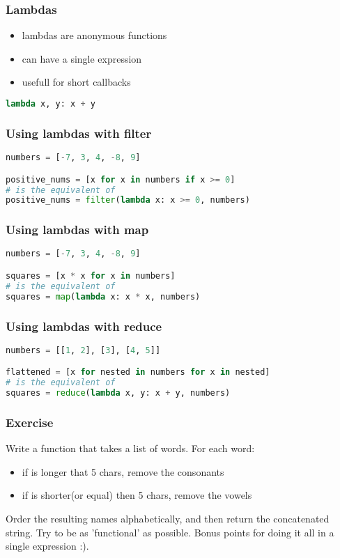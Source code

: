 \documentclass{beamer}
\begin{document}
\begin{frame}[fragile]
\frametitle{Lambdas}
\begin{itemize}
  \item lambdas are anonymous functions
  \item can have a single expression
  \item usefull for short callbacks
\end{itemize}
\begin{lstlisting}[language=python]
lambda x, y: x + y
\end{lstlisting}
\end{frame}


\begin{frame}[fragile]
\frametitle{Using lambdas with filter}
\begin{lstlisting}[language=python]
numbers = [-7, 3, 4, -8, 9]

positive_nums = [x for x in numbers if x >= 0]
# is the equivalent of
positive_nums = filter(lambda x: x >= 0, numbers)
\end{lstlisting}
\end{frame}

\begin{frame}[fragile]
\frametitle{Using lambdas with map}
\begin{lstlisting}[language=python]
numbers = [-7, 3, 4, -8, 9]

squares = [x * x for x in numbers]
# is the equivalent of
squares = map(lambda x: x * x, numbers)

\end{lstlisting}
\end{frame}

\begin{frame}[fragile]
\frametitle{Using lambdas with reduce}
\begin{lstlisting}[language=python]
numbers = [[1, 2], [3], [4, 5]]

flattened = [x for nested in numbers for x in nested]
# is the equivalent of
squares = reduce(lambda x, y: x + y, numbers)

\end{lstlisting}
\end{frame}


\begin{frame}[fragile]
\frametitle{Exercise}

Write a function that takes a list of words. For each word:
\begin{itemize}
   \item if is longer that 5 chars, remove the consonants
   \item if is shorter(or equal) then 5 chars, remove the vowels
\end{itemize}

Order the resulting names alphabetically, and then return the concatenated string.
\vspace{10 mm}
Try to be as 'functional' as possible. Bonus points for doing it all in a single expression :).

\end{frame}
\end{document}

